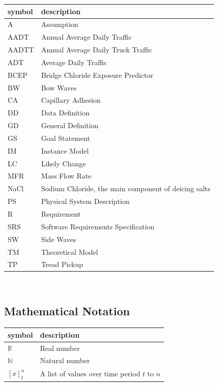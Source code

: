 \documentclass[12pt]{article}
\begin{document}
\renewcommand{\arraystretch}{1.2}
\begin{tabular}{l l} 
  \toprule		
  \textbf{symbol} & \textbf{description}\\
  \midrule 
A & Assumption\\
AADT & Annual Average Daily Traffic\\
AADTT & Annual Average Daily Truck Traffic\\
ADT & Average Daily Traffic\\
BCEP & Bridge Chloride Exposure Predictor \\
BW & Bow Waves\\
CA & Capillary Adhesion\\
DD & Data Definition\\
GD & General Definition\\
GS & Goal Statement\\
IM & Instance Model\\
LC & Likely Change\\
MFR & Mass Flow Rate\\
NaCl & Sodium Chloride, the main component of deicing salts\\
PS & Physical System Description\\
R & Requirement\\
SRS & Software Requirements Specification\\
SW & Side Waves\\
TM & Theoretical Model\\
TP & Tread Pickup\\

  \bottomrule
\end{tabular}\\

\subsection{Mathematical Notation}
\renewcommand{\arraystretch}{1.2}
\begin{tabular}{l l} 
  \toprule		
  \textbf{symbol} & \textbf{description}\\
  \midrule 
  $\mathbb{R}$ & Real number \\
  $\mathbb{N}$ & Natural number \\
  $[x]_t^n$ & A list of values over time period $t$ to $n$ \\

  \bottomrule
\end{tabular}\\
\end{document}

